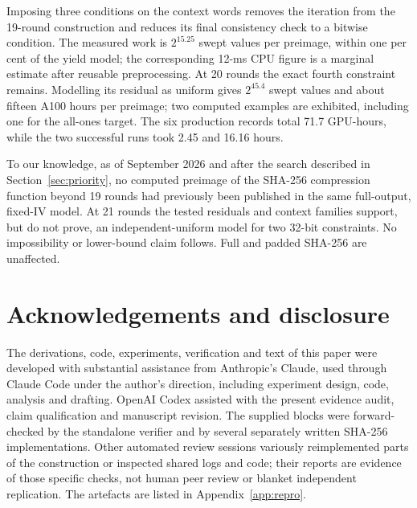 \documentclass[11pt,a4paper]{article}
\begin{document}
Imposing three conditions on the context words removes the iteration from the
19-round construction and reduces its final consistency check to a bitwise
condition.  The measured work is $2^{15.25}$ swept values per preimage, within
one per cent of the yield model; the corresponding 12-ms CPU figure is a
marginal estimate after reusable preprocessing.  At 20 rounds the exact
fourth constraint remains.  Modelling its residual as uniform gives
$2^{45.4}$ swept values and about fifteen A100 hours per preimage; two
computed examples are exhibited, including one for the all-ones target.
The six production records total 71.7 GPU-hours, while the two successful
runs took 2.45 and 16.16 hours.

To our knowledge, as of September 2026 and after the search described in
Section~\ref{sec:priority}, no computed preimage of the SHA-256 compression
function beyond 19 rounds had previously been published in the same
full-output, fixed-IV model.  At 21 rounds the tested residuals and context
families support, but do not prove, an independent-uniform model for two
32-bit constraints.  No impossibility or lower-bound claim follows.  Full and
padded SHA-256 are unaffected.

\section*{Acknowledgements and disclosure}
The derivations, code, experiments, verification and text of this paper were
developed with substantial assistance from Anthropic's Claude, used through
Claude Code under the author's direction, including experiment design, code,
analysis and drafting.  OpenAI Codex assisted with the present evidence audit,
claim qualification and manuscript revision.  The supplied blocks were
forward-checked by the standalone verifier and by several separately written
SHA-256 implementations.  Other automated review sessions variously
reimplemented parts of the construction or inspected shared logs and code;
their reports are evidence of those specific checks, not human peer review or
blanket independent replication.  The artefacts are listed in
Appendix~\ref{app:repro}.
\end{document}
